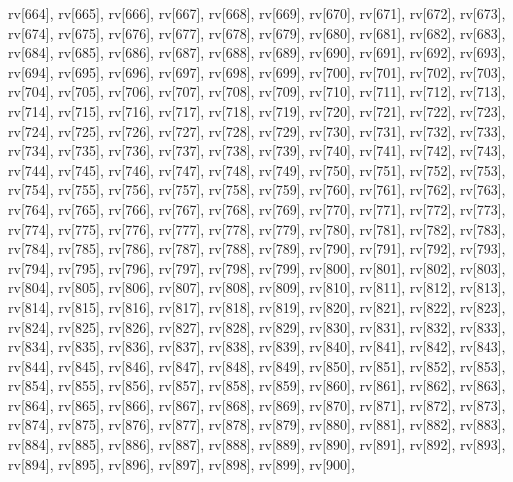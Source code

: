 \begin{DoxyCode}
{  rv[664],
  rv[665],
  rv[666],
  rv[667],
  rv[668],
  rv[669],
  rv[670],
  rv[671],
  rv[672],
  rv[673],
  rv[674],
  rv[675],
  rv[676],
  rv[677],
  rv[678],
  rv[679],
  rv[680],
  rv[681],
  rv[682],
  rv[683],
  rv[684],
  rv[685],
  rv[686],
  rv[687],
  rv[688],
  rv[689],
  rv[690],
  rv[691],
  rv[692],
  rv[693],
  rv[694],
  rv[695],
  rv[696],
  rv[697],
  rv[698],
  rv[699],
  rv[700],
  rv[701],
  rv[702],
  rv[703],
  rv[704],
  rv[705],
  rv[706],
  rv[707],
  rv[708],
  rv[709],
  rv[710],
  rv[711],
  rv[712],
  rv[713],
  rv[714],
  rv[715],
  rv[716],
  rv[717],
  rv[718],
  rv[719],
  rv[720],
  rv[721],
  rv[722],
  rv[723],
  rv[724],
  rv[725],
  rv[726],
  rv[727],
  rv[728],
  rv[729],
  rv[730],
  rv[731],
  rv[732],
  rv[733],
  rv[734],
  rv[735],
  rv[736],
  rv[737],
  rv[738],
  rv[739],
  rv[740],
  rv[741],
  rv[742],
  rv[743],
  rv[744],
  rv[745],
  rv[746],
  rv[747],
  rv[748],
  rv[749],
  rv[750],
  rv[751],
  rv[752],
  rv[753],
  rv[754],
  rv[755],
  rv[756],
  rv[757],
  rv[758],
  rv[759],
  rv[760],
  rv[761],
  rv[762],
  rv[763],
  rv[764],
  rv[765],
  rv[766],
  rv[767],
  rv[768],
  rv[769],
  rv[770],
  rv[771],
  rv[772],
  rv[773],
  rv[774],
  rv[775],
  rv[776],
  rv[777],
  rv[778],
  rv[779],
  rv[780],
  rv[781],
  rv[782],
  rv[783],
  rv[784],
  rv[785],
  rv[786],
  rv[787],
  rv[788],
  rv[789],
  rv[790],
  rv[791],
  rv[792],
  rv[793],
  rv[794],
  rv[795],
  rv[796],
  rv[797],
  rv[798],
  rv[799],
  rv[800],
  rv[801],
  rv[802],
  rv[803],
  rv[804],
  rv[805],
  rv[806],
  rv[807],
  rv[808],
  rv[809],
  rv[810],
  rv[811],
  rv[812],
  rv[813],
  rv[814],
  rv[815],
  rv[816],
  rv[817],
  rv[818],
  rv[819],
  rv[820],
  rv[821],
  rv[822],
  rv[823],
  rv[824],
  rv[825],
  rv[826],
  rv[827],
  rv[828],
  rv[829],
  rv[830],
  rv[831],
  rv[832],
  rv[833],
  rv[834],
  rv[835],
  rv[836],
  rv[837],
  rv[838],
  rv[839],
  rv[840],
  rv[841],
  rv[842],
  rv[843],
  rv[844],
  rv[845],
  rv[846],
  rv[847],
  rv[848],
  rv[849],
  rv[850],
  rv[851],
  rv[852],
  rv[853],
  rv[854],
  rv[855],
  rv[856],
  rv[857],
  rv[858],
  rv[859],
  rv[860],
  rv[861],
  rv[862],
  rv[863],
  rv[864],
  rv[865],
  rv[866],
  rv[867],
  rv[868],
  rv[869],
  rv[870],
  rv[871],
  rv[872],
  rv[873],
  rv[874],
  rv[875],
  rv[876],
  rv[877],
  rv[878],
  rv[879],
  rv[880],
  rv[881],
  rv[882],
  rv[883],
  rv[884],
  rv[885],
  rv[886],
  rv[887],
  rv[888],
  rv[889],
  rv[890],
  rv[891],
  rv[892],
  rv[893],
  rv[894],
  rv[895],
  rv[896],
  rv[897],
  rv[898],
  rv[899],
  rv[900],
}
\end{DoxyCode}
